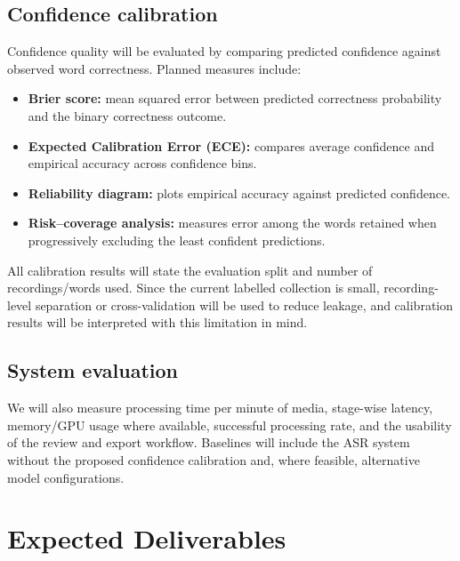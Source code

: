 \documentclass[11pt,a4paper]{article}
\begin{document}
\subsection{Confidence calibration}

Confidence quality will be evaluated by comparing predicted confidence
against observed word correctness. Planned measures include:
\begin{itemize}
  \item \textbf{Brier score:} mean squared error between predicted
  correctness probability and the binary correctness outcome.
  \item \textbf{Expected Calibration Error (ECE):} compares average
  confidence and empirical accuracy across confidence bins.
  \item \textbf{Reliability diagram:} plots empirical accuracy against
  predicted confidence.
  \item \textbf{Risk--coverage analysis:} measures error among the words
  retained when progressively excluding the least confident predictions.
\end{itemize}

All calibration results will state the evaluation split and number of
recordings/words used. Since the current labelled collection is small,
recording-level separation or cross-validation will be used to reduce
leakage, and calibration results will be interpreted with this limitation
in mind.

\subsection{System evaluation}

We will also measure processing time per minute of media, stage-wise
latency, memory/GPU usage where available, successful processing rate,
and the usability of the review and export workflow. Baselines will include
the ASR system without the proposed confidence calibration and, where
feasible, alternative model configurations.

\section{Expected Deliverables}
\end{document}
